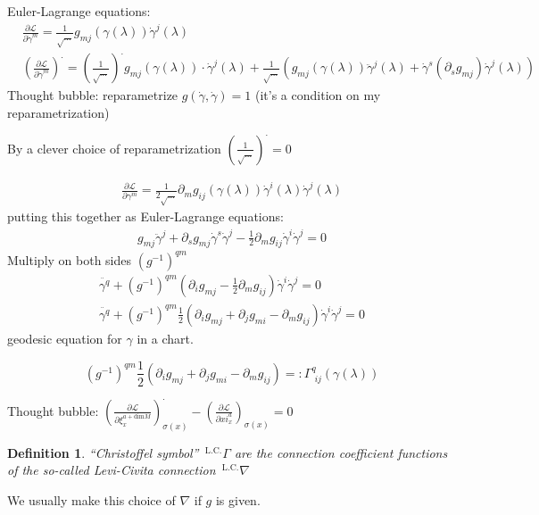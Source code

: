 \documentclass[10pt]{amsart}
\newtheorem{definition}{Definition}
\begin{document}
\begin{multicols*}{2}
	Euler-Lagrange equations:
	\[
	\begin{aligned}
	& \frac{ \partial \mathcal{L}}{ \partial \dot{\gamma}^m } = \frac{1}{ \sqrt{  \dots } } g_{mj}(\gamma(\lambda)) \dot{\gamma}^j(\lambda) \\ 
	& \left( \frac{ \partial \mathcal{L}}{ \partial \dot{\gamma}^m } \right)^{\cdot} = \left( \frac{1}{ \sqrt{ \dots } } \right)^{\cdot} g_{mj}(\gamma(\lambda)) \cdot \dot{\gamma}^j(\lambda) + \frac{1}{\sqrt{ \dots }} \left( g_{mj}(\gamma(\lambda)) \ddot{\gamma}^j(\lambda) + \dot{\gamma}^s(\partial_s g_{mj}) \dot{\gamma}^j(\lambda) \right)
	\end{aligned}
	\]
	Thought bubble: reparametrize $g(\dot{\gamma}, \dot{\gamma})=1$ (it's a condition on my reparametrization)
	
	By a clever choice of reparametrization $( \frac{1}{\sqrt{ \dots }} )^{\cdot} =0$
	
	\[
	\begin{gathered}
	\frac{ \partial \mathcal{L}}{ \partial \gamma^m} = \frac{1}{ 2\sqrt{ \dots }} \partial_m g_{ij}(\gamma(\lambda)) \dot{\gamma}^i(\lambda) \dot{\gamma}^j(\lambda)
	\end{gathered}
	\]
	putting this together as Euler-Lagrange equations:
	\[
	\begin{gathered}
	g_{mj} \ddot{\gamma}^j +   \partial_s g_{mj} \dot{\gamma}^s \dot{\gamma}^j - \frac{1}{2} \partial_m g_{ij} \dot{\gamma}^i \dot{\gamma}^j = 0 
	\end{gathered}
	\]
	Multiply on both sides $(g^{-1})^{qm}$
	\[
	\begin{gathered}
	\ddot{\gamma^q} + (g^{-1})^{qm}(\partial_i g_{mj} - \frac{1}{2} \partial_m g_{ij} ) \dot{\gamma}^i \dot{\gamma}^j = 0  \\ 
	\boxed{ \ddot{\gamma^q} + (g^{-1})^{qm}\frac{1}{2} (\partial_i g_{mj} + \partial_j g_{mi} -  \partial_m g_{ij} ) \dot{\gamma}^i \dot{\gamma}^j = 0 }
	\end{gathered}
	\]
	geodesic equation for $\gamma$ in a chart.  
	
	\[
	\boxed{ (g^{-1})^{qm}\frac{1}{2} (\partial_i g_{mj} + \partial_j g_{mi} -  \partial_m g_{ij} ) =: \Gamma^q_{ \,\, ij}(\gamma(\lambda))
	}
	\]
	
	Thought bubble: $\left( \frac{ \partial \mathcal{L}}{ \partial \xi_x^{a+\text{dim}M } } \right)^{\cdot}_{\sigma(x)} - \left( \frac{ \partial \mathcal{L}}{ \partial xi^a_x } \right)_{\sigma(x)} = 0$
	
	\begin{definition}
		``Christoffel symbol''   ${\,}^{\text{L.C.}}\Gamma$ are the connection coefficient functions of the so-called Levi-Civita connection ${\,}^{\text{L.C.}}\nabla$
	\end{definition}
	We usually make this choice of $\nabla$ if $g$ is given.  
	

\end{multicols*}
\end{document}
